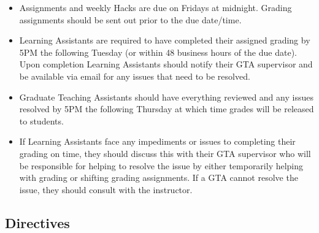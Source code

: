 \documentclass[12pt]{scrartcl}
\begin{document}
\begin{itemize}
  \item Assignments and weekly Hacks are due on Fridays at midnight.  
    Grading assignments should be sent out prior to the due date/time.
  \item Learning Assistants are required to have completed their assigned
    grading by 5PM the following Tuesday (or within 48 business hours of
    the due date).  Upon completion Learning
    Assistants should notify their GTA supervisor and be available via
    email for any issues that need to be resolved.
  \item Graduate Teaching Assistants should have everything reviewed and
    any issues resolved by 5PM the following Thursday at which time 
    grades will be released to students.
  \item If Learning Assistants face any impediments or issues to completing
    their grading on time, they should discuss this with their GTA supervisor
    who will be responsible for helping to resolve the issue by either 
    temporarily helping with grading or shifting grading assignments.  
    If a GTA cannot resolve the issue, they should consult with the 
    instructor.
\end{itemize}

\subsection*{Directives}
\end{document}
